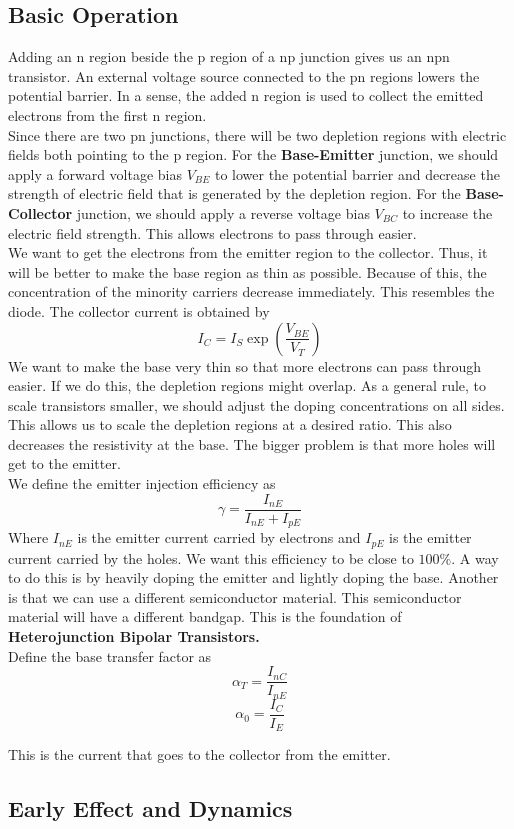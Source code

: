 \documentclass{article}
\begin{document}
\subsection{Basic Operation}
\noindent 
Adding an n region beside the p region of a np junction gives us an npn transistor.
An external voltage source connected to the pn regions lowers the potential barrier.
In a sense, the added n region is used to collect the emitted electrons from the first 
n region. 
\vspace{8pt}
\\ Since there are two pn junctions, there will be two depletion regions with electric
fields both pointing to the p region. For the \textbf{Base-Emitter} junction, we should 
apply a forward voltage bias $V_{BE}$ to lower the potential barrier and decrease the 
strength of electric field that is generated by the depletion region. For the 
\textbf{Base-Collector} junction, we should apply a reverse voltage bias $V_{BC}$ 
to increase the electric field strength. This allows electrons to pass through easier. 
\vspace{8pt}
\\ We want to get the electrons from the emitter region to the collector. Thus, it will
be better to make the base region as thin as possible. Because of this, the 
concentration of the minority carriers decrease immediately. This resembles the diode.
The collector current is obtained by 
$$I_{C}=I_{S}\exp \left(\frac{V_{BE}}{V_{T}}\right)$$
\noindent 
We want to make the base very thin so that more electrons can pass through easier. If
we do this, the depletion regions might overlap. As a general rule, to scale transistors
smaller, we should adjust the doping concentrations on all sides. This allows us to 
scale the depletion regions at a desired ratio. This also decreases the resistivity at
the base. The bigger problem is that more holes will get to the emitter. 
\vspace{8pt}
\\ We define the emitter injection efficiency as 
$$\gamma = \frac{I_{nE}}{I_{nE}+I_{pE}}$$
Where $I_{nE}$ is the emitter current carried by electrons and $I_{pE}$ is the emitter
current carried by the holes. We want this efficiency to be close to $100\%$. A way to 
do this is by heavily doping the emitter and lightly doping the base. Another is that 
we can use a different semiconductor material. This semiconductor material will have 
a different bandgap. This is the foundation of \textbf{Heterojunction Bipolar Transistors.}
\vspace{8pt}
\\
Define the base transfer factor as $$\alpha_{T} = \frac{I_{nC}}{I_{nE}}$$
$$\alpha_0 = \frac{I_C}{I_E}$$

\noindent 
This is the current that goes to the collector from the emitter. 

\newpage
\subsection{Early Effect and Dynamics}
\end{document}
